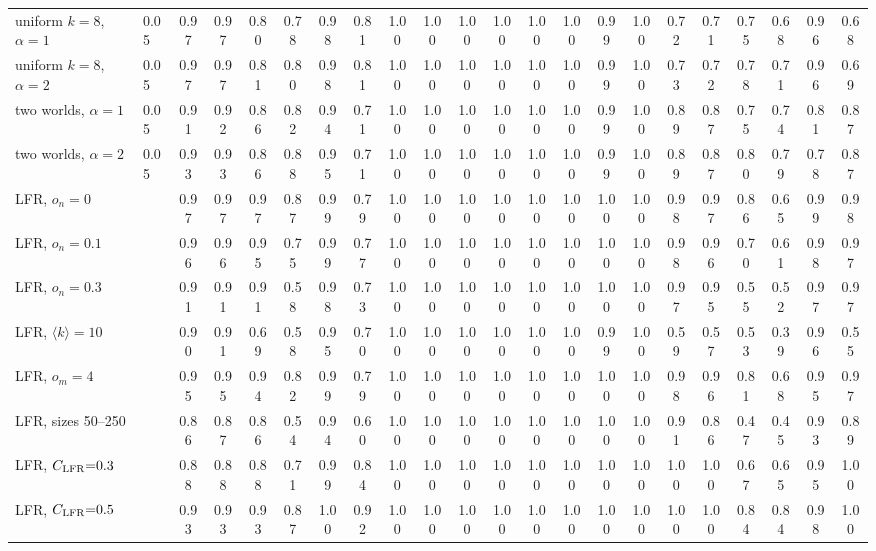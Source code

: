 \begin{table}[p]
{\begin{tabular}{llcccc|cc|cccccc|cccccccc}
\hline
uniform $k{=}8$, $\alpha{=}1$ & 0.05 & 0.97 & 0.97 & 0.80 & 0.78 & 0.98 & 0.81 & 1.00 & 1.00 & 1.00 & 1.00 & 1.00 & 1.00 & 0.99 & 1.00 & 0.72 & 0.71 & 0.75 & 0.68 & 0.96 & 0.68 \\
uniform $k{=}8$, $\alpha{=}2$ & 0.05 & 0.97 & 0.97 & 0.81 & 0.80 & 0.98 & 0.81 & 1.00 & 1.00 & 1.00 & 1.00 & 1.00 & 1.00 & 0.99 & 1.00 & 0.73 & 0.72 & 0.78 & 0.71 & 0.96 & 0.69 \\
two worlds, $\alpha{=}1$ & 0.05 & 0.91 & 0.92 & 0.86 & 0.82 & 0.94 & 0.71 & 1.00 & 1.00 & 1.00 & 1.00 & 1.00 & 1.00 & 0.99 & 1.00 & 0.89 & 0.87 & 0.75 & 0.74 & 0.81 & 0.87 \\
two worlds, $\alpha{=}2$ & 0.05 & 0.93 & 0.93 & 0.86 & 0.88 & 0.95 & 0.71 & 1.00 & 1.00 & 1.00 & 1.00 & 1.00 & 1.00 & 0.99 & 1.00 & 0.89 & 0.87 & 0.80 & 0.79 & 0.78 & 0.87 \\
\hline
LFR, $o_n{=}0$ &  & 0.97 & 0.97 & 0.97 & 0.87 & 0.99 & 0.79 & 1.00 & 1.00 & 1.00 & 1.00 & 1.00 & 1.00 & 1.00 & 1.00 & 0.98 & 0.97 & 0.86 & 0.65 & 0.99 & 0.98 \\
LFR, $o_n{=}0.1$ &  & 0.96 & 0.96 & 0.95 & 0.75 & 0.99 & 0.77 & 1.00 & 1.00 & 1.00 & 1.00 & 1.00 & 1.00 & 1.00 & 1.00 & 0.98 & 0.96 & 0.70 & 0.61 & 0.98 & 0.97 \\
LFR, $o_n{=}0.3$ &  & 0.91 & 0.91 & 0.91 & 0.58 & 0.98 & 0.73 & 1.00 & 1.00 & 1.00 & 1.00 & 1.00 & 1.00 & 1.00 & 1.00 & 0.97 & 0.95 & 0.55 & 0.52 & 0.97 & 0.97 \\
LFR, $\langle k\rangle{=}10$ &  & 0.90 & 0.91 & 0.69 & 0.58 & 0.95 & 0.70 & 1.00 & 1.00 & 1.00 & 1.00 & 1.00 & 1.00 & 0.99 & 1.00 & 0.59 & 0.57 & 0.53 & 0.39 & 0.96 & 0.55 \\
LFR, $o_m{=}4$ &  & 0.95 & 0.95 & 0.94 & 0.82 & 0.99 & 0.79 & 1.00 & 1.00 & 1.00 & 1.00 & 1.00 & 1.00 & 1.00 & 1.00 & 0.98 & 0.96 & 0.81 & 0.68 & 0.95 & 0.97 \\
LFR, sizes 50--250 &  & 0.86 & 0.87 & 0.86 & 0.54 & 0.94 & 0.60 & 1.00 & 1.00 & 1.00 & 1.00 & 1.00 & 1.00 & 1.00 & 1.00 & 0.91 & 0.86 & 0.47 & 0.45 & 0.93 & 0.89 \\
LFR, $C_{\rm LFR}{=}0.3$ &  & 0.88 & 0.88 & 0.88 & 0.71 & 0.99 & 0.84 & 1.00 & 1.00 & 1.00 & 1.00 & 1.00 & 1.00 & 1.00 & 1.00 & 1.00 & 1.00 & 0.67 & 0.65 & 0.95 & 1.00 \\
LFR, $C_{\rm LFR}{=}0.5$ &  & 0.93 & 0.93 & 0.93 & 0.87 & 1.00 & 0.92 & 1.00 & 1.00 & 1.00 & 1.00 & 1.00 & 1.00 & 1.00 & 1.00 & 1.00 & 1.00 & 0.84 & 0.84 & 0.98 & 1.00 \\
\hline\hline
\end{tabular}}
\end{table}

